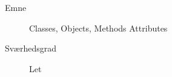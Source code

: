 \begin{description}
\item[Emne] Classes, Objects, Methods Attributes
\item[Sværhedsgrad] Let
\end{description}
